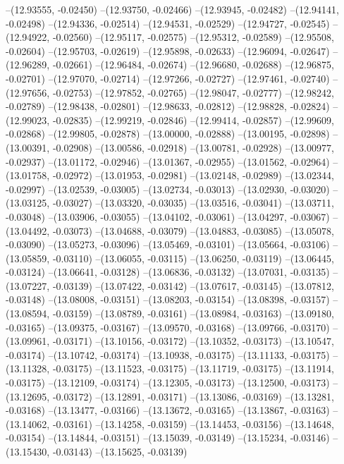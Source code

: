 --(12.93555, -0.02450)
--(12.93750, -0.02466)
--(12.93945, -0.02482)
--(12.94141, -0.02498)
--(12.94336, -0.02514)
--(12.94531, -0.02529)
--(12.94727, -0.02545)
--(12.94922, -0.02560)
--(12.95117, -0.02575)
--(12.95312, -0.02589)
--(12.95508, -0.02604)
--(12.95703, -0.02619)
--(12.95898, -0.02633)
--(12.96094, -0.02647)
--(12.96289, -0.02661)
--(12.96484, -0.02674)
--(12.96680, -0.02688)
--(12.96875, -0.02701)
--(12.97070, -0.02714)
--(12.97266, -0.02727)
--(12.97461, -0.02740)
--(12.97656, -0.02753)
--(12.97852, -0.02765)
--(12.98047, -0.02777)
--(12.98242, -0.02789)
--(12.98438, -0.02801)
--(12.98633, -0.02812)
--(12.98828, -0.02824)
--(12.99023, -0.02835)
--(12.99219, -0.02846)
--(12.99414, -0.02857)
--(12.99609, -0.02868)
--(12.99805, -0.02878)
--(13.00000, -0.02888)
--(13.00195, -0.02898)
--(13.00391, -0.02908)
--(13.00586, -0.02918)
--(13.00781, -0.02928)
--(13.00977, -0.02937)
--(13.01172, -0.02946)
--(13.01367, -0.02955)
--(13.01562, -0.02964)
--(13.01758, -0.02972)
--(13.01953, -0.02981)
--(13.02148, -0.02989)
--(13.02344, -0.02997)
--(13.02539, -0.03005)
--(13.02734, -0.03013)
--(13.02930, -0.03020)
--(13.03125, -0.03027)
--(13.03320, -0.03035)
--(13.03516, -0.03041)
--(13.03711, -0.03048)
--(13.03906, -0.03055)
--(13.04102, -0.03061)
--(13.04297, -0.03067)
--(13.04492, -0.03073)
--(13.04688, -0.03079)
--(13.04883, -0.03085)
--(13.05078, -0.03090)
--(13.05273, -0.03096)
--(13.05469, -0.03101)
--(13.05664, -0.03106)
--(13.05859, -0.03110)
--(13.06055, -0.03115)
--(13.06250, -0.03119)
--(13.06445, -0.03124)
--(13.06641, -0.03128)
--(13.06836, -0.03132)
--(13.07031, -0.03135)
--(13.07227, -0.03139)
--(13.07422, -0.03142)
--(13.07617, -0.03145)
--(13.07812, -0.03148)
--(13.08008, -0.03151)
--(13.08203, -0.03154)
--(13.08398, -0.03157)
--(13.08594, -0.03159)
--(13.08789, -0.03161)
--(13.08984, -0.03163)
--(13.09180, -0.03165)
--(13.09375, -0.03167)
--(13.09570, -0.03168)
--(13.09766, -0.03170)
--(13.09961, -0.03171)
--(13.10156, -0.03172)
--(13.10352, -0.03173)
--(13.10547, -0.03174)
--(13.10742, -0.03174)
--(13.10938, -0.03175)
--(13.11133, -0.03175)
--(13.11328, -0.03175)
--(13.11523, -0.03175)
--(13.11719, -0.03175)
--(13.11914, -0.03175)
--(13.12109, -0.03174)
--(13.12305, -0.03173)
--(13.12500, -0.03173)
--(13.12695, -0.03172)
--(13.12891, -0.03171)
--(13.13086, -0.03169)
--(13.13281, -0.03168)
--(13.13477, -0.03166)
--(13.13672, -0.03165)
--(13.13867, -0.03163)
--(13.14062, -0.03161)
--(13.14258, -0.03159)
--(13.14453, -0.03156)
--(13.14648, -0.03154)
--(13.14844, -0.03151)
--(13.15039, -0.03149)
--(13.15234, -0.03146)
--(13.15430, -0.03143)
--(13.15625, -0.03139)
